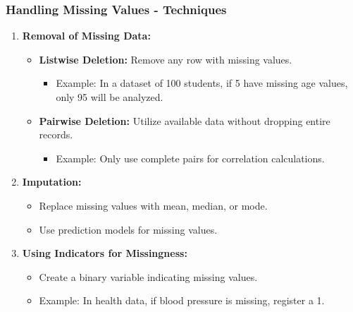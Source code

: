 \documentclass[aspectratio=169]{beamer}
\begin{document}
\begin{frame}[fragile]
    \frametitle{Handling Missing Values - Techniques}
    \begin{enumerate}
        \item \textbf{Removal of Missing Data:}
        \begin{itemize}
            \item \textbf{Listwise Deletion:} Remove any row with missing values.
            \begin{itemize}
                \item Example: In a dataset of 100 students, if 5 have missing age values, only 95 will be analyzed.
            \end{itemize}
            \item \textbf{Pairwise Deletion:} Utilize available data without dropping entire records.
            \begin{itemize}
                \item Example: Only use complete pairs for correlation calculations.
            \end{itemize}
        \end{itemize}
        
        \item \textbf{Imputation:}
        \begin{itemize}
            \item Replace missing values with mean, median, or mode.
            \item Use prediction models for missing values.
        \end{itemize}
        
        \item \textbf{Using Indicators for Missingness:}
        \begin{itemize}
            \item Create a binary variable indicating missing values.
            \item Example: In health data, if blood pressure is missing, register a 1.
        \end{itemize}
    \end{enumerate}
\end{frame}
\end{document}
